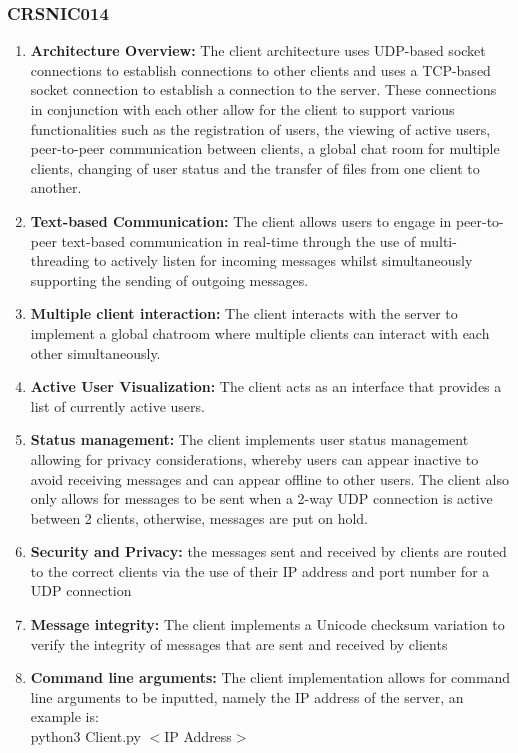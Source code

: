 \documentclass{article}
\begin{document}
\subsubsection{CRSNIC014}

\begin{enumerate}
    \item \textbf{Architecture Overview:} The client architecture uses UDP-based socket connections to establish connections to other clients and uses a TCP-based socket connection to establish a connection to the server. These connections in conjunction with each other allow for the client to support various functionalities such as the registration of users, the viewing of active users, peer-to-peer communication between clients, a global chat room for multiple clients, changing of user status and the transfer of files from one client to another.
    \item \textbf{Text-based Communication:} The client allows users to engage in peer-to-peer text-based communication in real-time through the use of multi-threading to actively listen for incoming messages whilst simultaneously supporting the sending of outgoing messages.
    \item \textbf{Multiple client interaction:} The client interacts with the server to implement a global chatroom where multiple clients can interact with each other simultaneously.
    \item \textbf{Active User Visualization:} The client acts as an interface that provides a list of currently active users.
    \item \textbf{Status management:} The client implements user status management allowing for privacy considerations, whereby users can appear inactive to avoid receiving messages and can appear offline to other users. The client also only allows for messages to be sent when a 2-way UDP connection is active between 2 clients, otherwise, messages are put on hold.
    \item \textbf{Security and Privacy:} the messages sent and received by clients are routed to the correct clients via the use of their IP address and port number for a UDP connection
    \item \textbf{Message integrity:} The client implements a Unicode checksum variation to verify the integrity of messages that are sent and received by clients
    \item \textbf{Command line arguments:} The client implementation allows for command line arguments to be inputted, namely the IP address of the server, an example is:\\
python3 Client.py \(<\)IP Address\(>\)\\
\end{enumerate}
\end{document}
